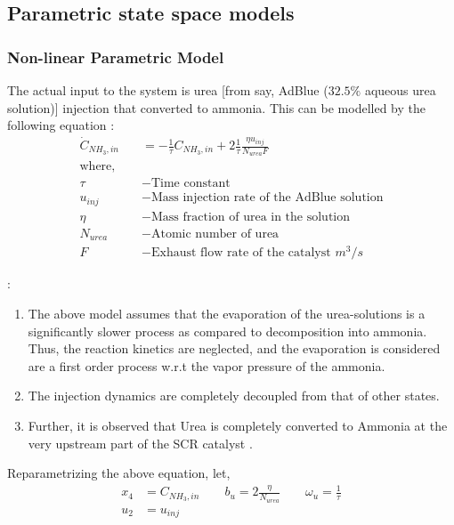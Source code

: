 \subsection{Parametric state space models}

\subsubsection{Non-linear Parametric Model}
The actual input to the system is urea [from say, AdBlue ($32.5\%$ aqueous urea
solution)] injection that converted to ammonia. This can be modelled by the following equation \cite{nova2014urea}:
\begin{align*}
    \dot C_{NH_3, in} &= - \frac{1}{\tau} C_{NH_3, in} + 2 \frac{1}{\tau} \frac{ \eta u_{inj}}{N_{urea} F}\\
    \text{where, } \quad &\\
    \tau &- \text{Time constant}\\
    u_{inj} &- \text{Mass injection rate of the AdBlue solution}\\
    \eta &- \text{Mass fraction of urea in the solution}\\
    N_{urea} &- \text{Atomic number of urea}\\
    F &- \text{Exhaust flow rate of the catalyst } m^3/s
\end{align*}

:
\begin{enumerate}
    \item The above model assumes that the evaporation of the urea-solutions is a significantly slower process as
        compared to  decomposition into ammonia. Thus, the reaction
        kinetics are neglected, and the evaporation is considered are a first
        order process w.r.t the vapor pressure of the ammonia.
    \item The injection dynamics are completely decoupled from that of other
        states.
    \item Further, it is observed that Urea is completely converted to Ammonia
        at the very upstream part of the SCR catalyst
        \cite{hsieh2011development}.
\end{enumerate}

Reparametrizing the above equation, let,
\begin{align*}
    x_4 &= C_{NH_3, in} \qquad b_u = 2 \frac{ \eta}{N_{urea}} \qquad \omega_u = \frac{1}{\tau}\\
    u_2 &= u_{inj}
\end{align*}

